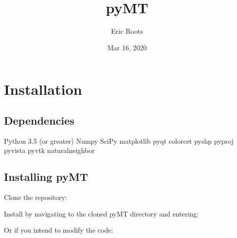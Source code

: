 \documentclass[letterpaper,10pt,english]{sphinxmanual}
\title{pyMT}
\date{Mar 16, 2020}
\author{Eric Roots}
\begin{document}
\pagestyle{empty}
\sphinxmaketitle
\pagestyle{plain}
\sphinxtableofcontents
\pagestyle{normal}
\label{\detokenize{index::doc}}



\chapter{Installation}
\label{\detokenize{content/api_core/installation:installation}}\label{\detokenize{content/api_core/installation::doc}}

\section{Dependencies}
\label{\detokenize{content/api_core/installation:dependencies}}
Python 3.5 (or greater)
Numpy
SciPy
matplotlib
pyqt
colorcet
pyshp
pyproj
pyvista
pyvtk
naturalneighbor


\section{Installing pyMT}
\label{\detokenize{content/api_core/installation:installing-pymt}}
Clone the repository:

\begin{sphinxVerbatim}[commandchars=\\\{\}]
  
\end{sphinxVerbatim}

Install by navigating to the cloned pyMT directory and entering:

\begin{sphinxVerbatim}[commandchars=\\\{\}]
  
\end{sphinxVerbatim}

Or if you intend to modify the code:

\begin{sphinxVerbatim}[commandchars=\\\{\}]
  
\end{sphinxVerbatim}
\end{document}
